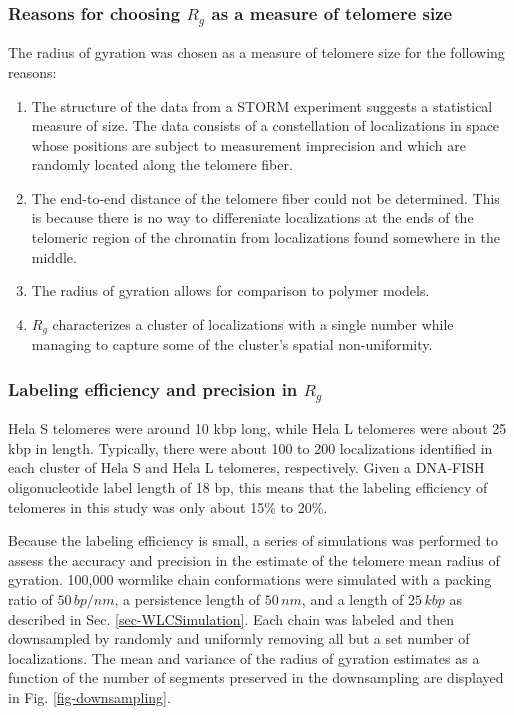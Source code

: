 \documentclass[12pt, a4paper]{article}
\begin{document}
\subsubsection{Reasons for choosing $R_g$ as a measure of telomere size}
\label{sec-1-3-2}
The radius of gyration was chosen as a measure of telomere size
for the following reasons:
\begin{enumerate}
\item The structure of the data from a STORM experiment suggests a
statistical measure of size. The data consists of a
constellation of localizations in space whose positions are
subject to measurement imprecision and which are randomly
located along the telomere fiber.
\item The end-to-end distance of the telomere fiber could not be
determined. This is because there is no way to differeniate
localizations at the ends of the telomeric region of the
chromatin from localizations found somewhere in the middle.
\item The radius of gyration allows for comparison to polymer models.
\item $R_g$ characterizes a cluster of localizations with a single
number while managing to capture some of the cluster's spatial
non-uniformity.
\end{enumerate}

\subsubsection{Labeling efficiency and precision in $R_g$}
\label{sec-1-3-3}
\label{sec-RgPrecision}
Hela S telomeres were around 10 kbp long, while Hela L telomeres
were about 25 kbp in length. Typically, there were about 100 to 200
localizations identified in each cluster of Hela S and Hela L
telomeres, respectively. Given a DNA-FISH oligonucleotide label
length of 18 bp, this means that the labeling efficiency of
telomeres in this study was only about 15\% to 20\%.

Because the labeling efficiency is small, a series of simulations
was performed to assess the accuracy and precision in the estimate
of the telomere mean radius of gyration. 100,000 wormlike chain
conformations were simulated with a packing ratio of $50 \,
    bp/nm$, a persistence length of $50 \, nm$, and a length of $25 \,
    kbp$ as described in Sec. \ref{sec-WLCSimulation}. Each chain was
labeled and then downsampled by randomly and uniformly removing
all but a set number of localizations. The mean and variance of
the radius of gyration estimates as a function of the number of
segments preserved in the downsampling are displayed in
Fig. \ref{fig-downsampling}.
\end{document}

